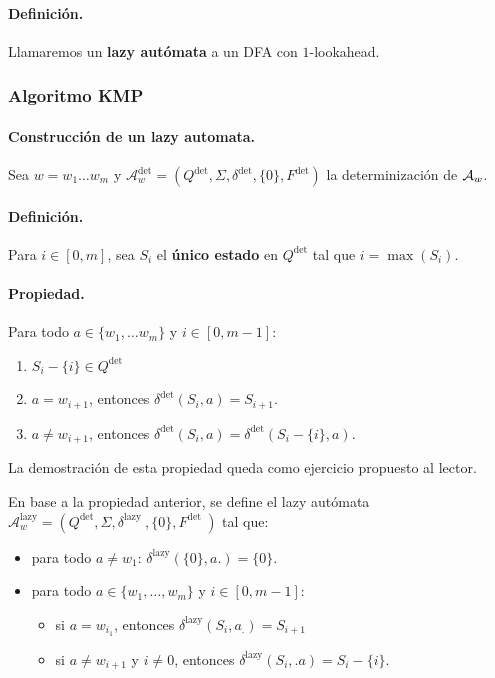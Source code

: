 \paragraph{Definición.} Llamaremos un \textbf{lazy autómata} a un DFA con $1$-lookahead.

\subsubsection{Algoritmo KMP}

\paragraph{Construcción de un lazy automata.} Sea $w = w_1 \ldots w_m$ y $\mathcal{A}_w^{\mathrm{det}}=\left(Q^{\mathrm{det}}, \Sigma, \delta^{\mathrm{det}},\{0\}, F^{\mathrm{det}}\right)$ la determinización de $\mathcal{A}_w$.

\paragraph{Definición.} Para $i \in [0,m]$, sea $S_i$ el \textbf{único estado} en $Q^\text{det}$ tal que $i = \max(S_i)$.

\paragraph{Propiedad.} Para todo $a \in \{w_1,\ldots w_m\}$ y $i \in [0,m-1]$:
\begin{enumerate}
    \item $S_i-\{i\} \in Q^{\operatorname{det}}$
    \item $a=w_{i+1}$, entonces $\delta^{\operatorname{det}}\left(S_i, a\right)=S_{i+1}$.
    \item $a \neq w_{i+1}$, entonces $\delta^{\operatorname{det}}\left(S_i, a\right)=\delta^{\operatorname{det}}\left(S_i-\{i\}, a\right)$.
\end{enumerate}
La demostración de esta propiedad queda como ejercicio propuesto al lector. \medbreak

En base a la propiedad anterior, se define el lazy autómata $\mathcal{A}_w^{\text {lazy}}=\left(Q^{\text {det}}, \Sigma, \delta^{\text {lazy }},\{0\}, F^{\text {det }}\right)$ tal que:
\begin{itemize}
    \item para todo $a\neq w_1$: $\delta^{\text {lazy}}(\{0\}, a .)=\{0\}$.
    \item para todo $a \in \{w_1,\ldots, w_m\}$ y $i \in [0,m-1]$:
          \begin{itemize}
              \item si $a = w_{i_1}$, entonces $\delta^{\text {lazy}}\left(S_i, a_{.}\right)=S_{i+1}$
              \item si $a \neq w_{i+1}$ y $i \neq 0$, entonces $\delta^{\text {lazy}}\left(S_i, . a\right)=S_i-\{i\}$.
          \end{itemize}
\end{itemize}

